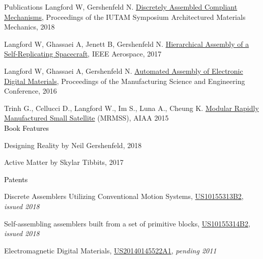 \documentclass{resume} %
\begin{document}
\begin{rSection}{Publications}
Langford W, Gershenfeld N. \href{https://docs.lib.purdue.edu/iutam/presentations/abstracts/45}{Discretely Assembled Compliant Mechanisms}, Proceedings of the IUTAM Symposium Architectured Materials Mechanics, 2018

Langford W, Ghassaei A, Jenett B, Gershenfeld N. \href{http://cba.mit.edu/docs/papers/17.04.11.SelfAssemSpacecraft.pdf}{Hierarchical Assembly of a Self-Replicating Spacecraft}, IEEE Aerospace, 2017

Langford W, Ghassaei A, Gershenfeld N. \href{http://cba.mit.edu/docs/papers/16.07.msec.stapler.pdf}{Automated Assembly of Electronic Digital Materials}, Proceedings of the Manufacturing Science and Engineering Conference, 2016

Trinh G., Cellucci D., Langford W., Im S., Luna A., Cheung K. \href{https://doi.org/10.2514/6.2015-0941}{Modular Rapidly Manufactured Small Satellite} (MRMSS), AIAA 2015
\sectionskip
\\\textcolor{black}{Book Features}

\begingroup\leftskip=0.7cm
Designing Reality by Neil Gershenfeld, 2018

Active Matter by Skylar Tibbits, 2017

\endgroup

\textcolor{black}{Patents}

\begingroup\leftskip=0.7cm


Discrete Assemblers Utilizing Conventional Motion Systems, \href{https://patents.google.com/patent/US10155313B2/}{US10155313B2}, {\em issued 2018}

Self-assembling assemblers %
built from a set of primitive blocks, \href{https://patents.google.com/patent/US10155314B2}{US10155314B2}, {\em issued 2018}

Electromagnetic Digital Materials, \href{https://patents.google.com/patent/US20140145522A1}{US20140145522A1}, {\em pending 2011}


\endgroup

\end{rSection}
\end{document}

